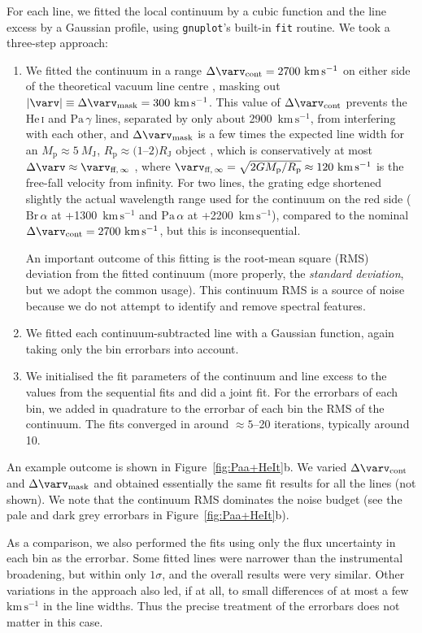 \documentclass[twocolumn,twocolumnappendix]{aastex631}
\newcommand{\neuI}[1]{{\leavevmode{\boldmath\bfseries#1}}}
\renewcommand{\neuI}[1]{{\leavevmode#1}}
\def\MJ{\ensuremath{M_{\textrm{J}}}\xspace}        %
\def\RJ{\ensuremath{R_{\textrm{J}}}\xspace}        %
\def\Paa{\ensuremath{\mathrm{Pa}\,\alpha}\xspace}           %
\def\Pag{\ensuremath{\mathrm{Pa}\,\gamma}\xspace}           %
\def\Bra{\ensuremath{\mathrm{Br}\,\alpha}\xspace}           %
\def\HeI{\ensuremath{\mathrm{He}}\,\textsc{i}\xspace}       %
\def\HeIt{\HeI}                     %
\def\MP{\ensuremath{M_{\textrm{p}}}\xspace}        %
\def\RP{\ensuremath{R_{\textrm{p}}}\xspace}        %
\newcommand{\vFfinfty}{\ensuremath{{\varv_{\textrm{ff},\,\infty}}}\xspace}
\def\DvKont{\ensuremath{\Delta \varv_{\mathrm{cont}}}\xspace}
\def\DvMask{\ensuremath{\Delta \varv_{\mathrm{mask}}}\xspace}
\def\kms{\ensuremath{\textrm{km}\,\textrm{s}^{-1}}\xspace}    %
\begin{document}
For each line, we fitted the local continuum by a cubic function and the line excess by a Gaussian profile, using  \texttt{gnuplot}'s built-in \texttt{fit} routine.
We took a three-step approach:
\begin{enumerate}
    \item 
We fitted the continuum in a range $\DvKont=2700~\kms$ on either side of the theoretical vacuum line centre \citep{Wiese+Fuhr2009}, masking out $|\varv|\equiv\DvMask=300~\kms$.
This value of \DvKont prevents the \HeIt and \Pag lines, separated by only about 2900~\kms, from interfering with each other, and \DvMask is a few times the expected line width for an $\MP\approx5~\MJ$, $\RP\approx(1$--$2)\RJ$ object \citep{luhman23c}, which is conservatively at most $\Delta \varv\approx\vFfinfty$ \citep{aoyama18}, where $\vFfinfty=\sqrt{2G\MP/\RP}\approx120~\kms$ is the free-fall velocity from infinity.
For two lines, the grating edge shortened slightly the actual wavelength \neuI{range} used for the continuum on the red side (\Bra at +1300~\kms and \Paa at +2200~\kms), compared to the nominal $\DvKont=2700~\kms$, but this is inconsequential.
%

An important outcome of this fitting is the root-mean square (RMS) deviation from the fitted continuum \neuI{(more properly, the \textit{standard deviation}, but we adopt the common usage)}. This continuum RMS is a source of noise because we do not attempt to identify and remove spectral features.

\item We fitted each continuum-subtracted line with a Gaussian function, again taking only the bin errorbars into account.

\item We initialised the fit parameters of the continuum and line excess to the values from the sequential fits and did a joint fit.
For the errorbars of each bin, we added in quadrature to the errorbar of each bin the RMS of the continuum.
%
%
The fits converged in around $\approx5$--20 iterations, typically around 10.

\end{enumerate}
An example outcome is shown in Figure~\ref{fig:Paa+HeIt}b.
%
We varied \DvKont and \DvMask and obtained essentially the same fit results for all the lines (not shown).
We note that the continuum RMS dominates the noise budget (see the pale and dark grey errorbars in Figure~\ref{fig:Paa+HeIt}b).


As a comparison, we also performed the fits using only the flux uncertainty in each bin as the errorbar. Some fitted lines were narrower than the instrumental broadening, but within only $1\sigma$, and the overall results were very similar.
Other variations  %
in the approach also led, if at all, to small differences of at most a few \kms in the line widths.
Thus the precise treatment of the errorbars does not matter in this case.
\end{document}
